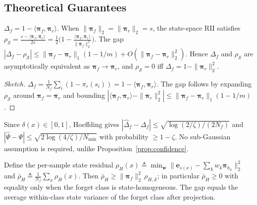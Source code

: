 \documentclass[smallextended]{svjour3}       %
\newcommand{\coloneqq}{\triangleq}
\begin{document}
\subsection{Theoretical Guarantees}

\begin{proposition}
\label{prop:pssd_rii}
$\Delta_f = 1-\langle\boldsymbol{\pi}_f,\boldsymbol{\pi}_r\rangle$. When $\|\boldsymbol{\pi}_f\|_2=\|\boldsymbol{\pi}_r\|_2=s$, the state-space RII satisfies $\rho_{\mathcal{S}}=\frac{s-\langle\boldsymbol{\pi}_f,\boldsymbol{\pi}_r\rangle}{2s}=\frac{1}{2}\bigl(1-\frac{\langle\boldsymbol{\pi}_f,\boldsymbol{\pi}_r\rangle}{\|\boldsymbol{\pi}_f\|_2^2}\bigr)$. The gap $|\Delta_f-\rho_{\mathcal{S}}|\le\|\boldsymbol{\pi}_f-\boldsymbol{\pi}_r\|_1(1-1/m)+O(\|\boldsymbol{\pi}_f-\boldsymbol{\pi}_r\|_2^2)$. Hence $\Delta_f$ and $\rho_{\mathcal{S}}$ are asymptotically equivalent as $\boldsymbol{\pi}_f\to\boldsymbol{\pi}_r$, and $\rho_{\mathcal{S}}=0$ iff $\Delta_f = 1-\|\boldsymbol{\pi}_r\|_2^2$.
\end{proposition}

\begin{proof}[Sketch]
$\Delta_f=\frac1{N_f}\sum_i(1-\pi_r(s_i))=1-\langle\boldsymbol{\pi}_f,\boldsymbol{\pi}_r\rangle$. The gap follows by expanding $\rho_{\mathcal{S}}$ around $\boldsymbol{\pi}_f=\boldsymbol{\pi}_r$ and bounding $|\langle\boldsymbol{\pi}_f,\boldsymbol{\pi}_r\rangle-\|\boldsymbol{\pi}_r\|_2^2|\le\|\boldsymbol{\pi}_f-\boldsymbol{\pi}_r\|_1(1-1/m)$.
\end{proof}

\begin{proposition}
\label{prop:pssd_conc}
Since $\delta(x)\in[0,1]$, Hoeffding gives $|\hat{\Delta}_f-\Delta_f|\le\sqrt{\log(2/\zeta)/(2N_f)}$ and $|\hat{\Psi}-\Psi|\le\sqrt{2\log(4/\zeta)/N_{\min}}$ with probability $\ge1-\zeta$. No sub-Gaussian assumption is required, unlike Proposition~\ref{prop:confidence}.
\end{proposition}

\begin{proposition}
\label{prop:ps_mhpr}
Define the per-sample state residual $\rho_H(x)\coloneqq\min_{\mathbf{w}}\|\mathbf{e}_{s(x)}-\sum_k w_k\boldsymbol{\pi}_{h_k}\|_2^2$ and $\bar{\rho}_H\coloneqq\frac1{N_f}\sum_x\rho_H(x)$. Then $\bar{\rho}_H \ge \|\boldsymbol{\pi}_f\|_2^2\,\rho_{H,\mathcal{S}}$; in particular $\bar{\rho}_H\ge0$ with equality only when the forget class is state-homogeneous. The gap equals the average within-class state variance of the forget class after projection.
\end{proposition}
\end{document}
